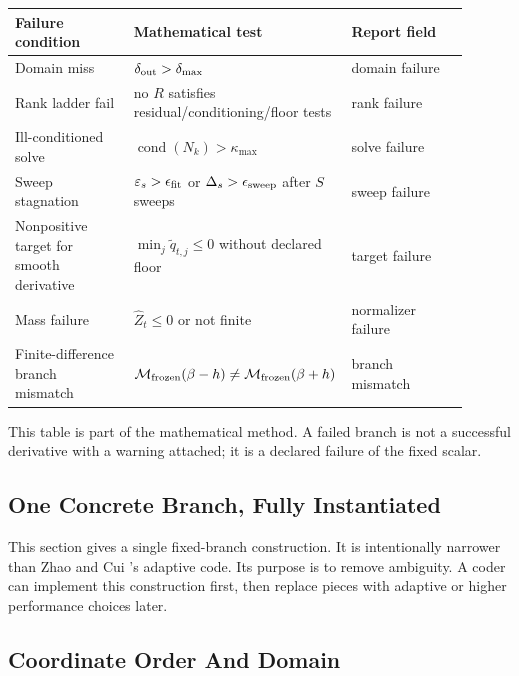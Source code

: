 \documentclass[11pt]{article}
\numberwithin{equation}{section}
\begin{document}
\begin{center}
\begin{tabular}{p{0.28\linewidth}p{0.34\linewidth}p{0.28\linewidth}}
\toprule
Failure condition & Mathematical test & Report field\\
\midrule
Domain miss &
\(\delta_{\rm out}>\delta_{\max}\) &
domain failure\\
Rank ladder fail &
no \(R\) satisfies residual/conditioning/floor tests &
rank failure\\
Ill-conditioned solve &
\(\operatorname{cond}(N_k)>\kappa_{\max}\) &
solve failure\\
Sweep stagnation &
\(\varepsilon_s>\epsilon_{\rm fit}\) or \(\Delta_s>\epsilon_{\rm sweep}\) after \(S\) sweeps &
sweep failure\\
Nonpositive target for smooth derivative &
\(\min_j\widetilde q_{t,j}\le0\) without declared floor &
target failure\\
Mass failure &
\(\widehat Z_t\le0\) or not finite &
normalizer failure\\
Finite-difference branch mismatch &
\(\mathcal M_{\rm frozen}(\beta-h)\ne\mathcal M_{\rm frozen}(\beta+h)\) &
branch mismatch\\
\bottomrule
\end{tabular}
\end{center}

This table is part of the mathematical method.  A failed branch is not a
successful derivative with a warning attached; it is a declared failure of the
fixed scalar.

\subsection{One Concrete Branch, Fully Instantiated}

This section gives a single fixed-branch construction.  It is intentionally narrower
than Zhao and Cui \cite{zhao2024ttsequential}'s adaptive code.  Its purpose is to remove ambiguity.  A coder
can implement this construction first, then replace pieces with adaptive or higher
performance choices later.

\subsection{Coordinate Order And Domain}
\end{document}
